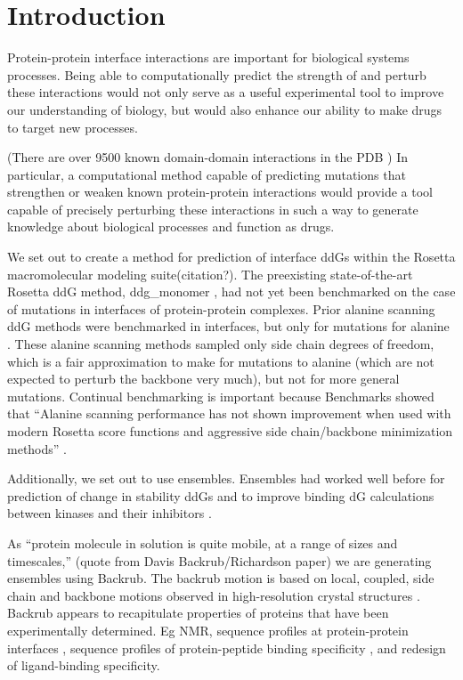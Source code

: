 \section{Introduction}

Protein-protein interface interactions are important for biological systems processes.
Being able to computationally predict the strength of and perturb these interactions would not only serve as a useful experimental tool to improve our understanding of biology, but would also enhance our ability to make drugs to target new processes.

(There are over 9500 known domain-domain interactions in the PDB \cite{finn_ipfam:_2014}) In particular, a computational method capable of predicting mutations that strengthen or weaken known protein-protein interactions would provide a tool capable of precisely perturbing these interactions in such a way to generate knowledge about biological processes and function as drugs.

We set out to create a method for prediction of interface ddGs within the Rosetta macromolecular modeling suite(citation?). The preexisting state-of-the-art Rosetta ddG method,  ddg\_monomer \cite{Kellogg_role_2011}, had not yet been benchmarked on the case of mutations in interfaces of protein-protein complexes. Prior alanine scanning ddG methods were benchmarked in interfaces, but only for mutations for alanine \cite{kortemme_simple_2002,conchuir_web_2015}. These alanine scanning methods sampled only side chain degrees of freedom, which is a fair approximation to make for mutations to alanine (which are not expected to perturb the backbone very much), but not for more general mutations. Continual benchmarking is important because Benchmarks showed that ``Alanine scanning performance has not shown improvement when used with modern Rosetta score functions and aggressive side chain/backbone minimization methods'' \cite{conchuir_web_2015}.

Additionally, we set out to use ensembles. Ensembles had worked well before for prediction of change in stability ddGs \cite{benedix_predicting_2009} and to improve binding dG calculations between kinases and their inhibitors \cite{araki_effect_2016}.

As ``protein molecule in solution is quite mobile, at a range of sizes and timescales,'' (quote from Davis Backrub/Richardson paper) we are generating ensembles using Backrub. The backrub motion is based on local, coupled, side chain and backbone motions observed in high-resolution crystal structures \cite{davis_backrub_2006}. Backrub appears to recapitulate properties of proteins that have been experimentally determined. Eg NMR\cite{friedland_correspondence_2009}, sequence profiles at protein-protein interfaces \cite{humphris_prediction_2008}, sequence profiles of protein-peptide binding specificity \cite{smith_structure-based_2010,smith_predicting_2011}, and redesign of ligand-binding specificity\cite{ollikainen_coupling_2015}.

